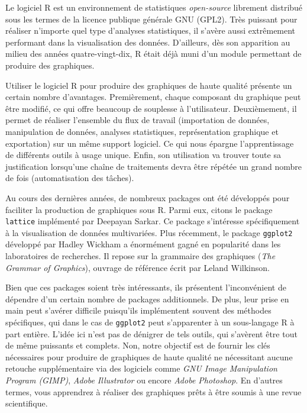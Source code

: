 \documentclass[]{article}
\begin{document}
Le logiciel R est un environnement de statistiques \emph{open-source} librement distribué sous les termes de la licence publique générale GNU (GPL2). Très puissant pour réaliser n'importe quel type d'analyses statistiques, il s'avère aussi extrêmement performant dans la visualisation des données.
D'ailleurs, dès son apparition au milieu des années quatre-vingt-dix, R était déjà muni d'un module permettant de produire des graphiques.

Utiliser le logiciel R pour produire des graphiques de haute qualité présente un certain nombre d'avantages. Premièrement, chaque composant du graphique peut être modifié, ce qui offre beaucoup de souplesse à l'utilisateur. Deuxièmement, il permet de réaliser l'ensemble du flux de travail (importation de données, manipulation de données, analyses statistiques, représentation graphique et exportation) sur un même support logiciel. Ce qui nous épargne l'apprentissage de différents outils à usage unique. Enfin, son utilisation va trouver toute sa justification lorsqu'une chaîne de traitements devra être répétée un grand nombre de fois (automatisation des tâches).

Au cours des dernières années, de nombreux packages ont été développés pour faciliter la production de graphiques sous R. Parmi eux, citons le package \texttt{lattice} implémenté par Deepayan Sarkar. Ce package s'intéresse spécifiquement à la visualisation de données multivariées. Plus récemment, le package \texttt{ggplot2} développé par Hadley Wickham a énormément gagné en popularité dans les laboratoires de recherches. Il repose sur la grammaire des graphiques (\emph{The Grammar of Graphics}), ouvrage de référence écrit par Leland Wilkinson.

Bien que ces packages soient très intéressants, ils présentent l'inconvénient de dépendre d'un certain nombre de packages additionnels. De plus, leur prise en main peut s'avérer difficile puisqu'ils implémentent souvent des méthodes spécifiques, qui dans le cas de \texttt{ggplot2} peut s'apparenter à un sous-langage R à part entière. L'idée ici n'est pas de dénigrer de tels outils, qui s'avèrent être tout de même puissants et complets. Non, notre objectif est de fournir les clés nécessaires pour produire de graphiques de haute qualité ne nécessitant aucune retouche supplémentaire via des logiciels comme \textit{GNU Image Manipulation Program (GIMP)}, \emph{Adobe Illustrator} ou encore \emph{Adobe Photoshop}. En d'autres termes, vous apprendrez à réaliser des graphiques prêts à être soumis à une revue scientifique.
\end{document}

